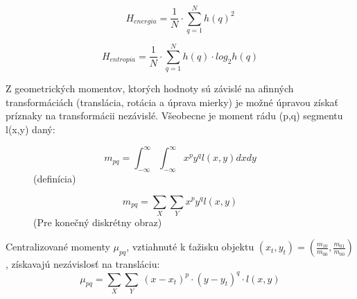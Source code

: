 \begin{figure}[!ht]
\begin{minipage}[b]{0.5\textwidth}
\begin{equation}
                \end{equation}
            \end{minipage}
            \begin{minipage}[b]{0.45\textwidth}
                \begin{equation}
                    H_{energia} = \frac{1}{N} \cdot \sum_{q=1}^{N} h(q)^2
                \end{equation}
            \end{minipage}
            \begin{minipage}[b]{0.45\textwidth}
                \begin{equation}
                    H_{entropia} = \frac{1}{N} \cdot \sum_{q=1}^{N} h(q) \cdot log_2h(q)
                \end{equation}
            \end{minipage}
        \end{figure}

        Z geometrických momentov, ktorých hodnoty sú závislé na afinných transformáciách (translácia, rotácia a úprava mierky) je možné úpravou získať príznaky na transformácii nezávislé. \cite{Erbo2017} Všeobecne je moment rádu (p,q) segmentu l(x,y) daný:
        \begin{figure}[!ht]
            \begin{minipage}[b]{0.45\textwidth}
                \begin{equation}
                    m_{pq} = \int_{-\infty}^\infty\int_{-\infty}^\infty x^p y^q l(x,y) dx dy
                \end{equation}
                \centering
                (definícia)
            \end{minipage}
            \begin{minipage}[b]{0.45\textwidth}
                \begin{equation}
                    m_{pq} = \sum_{X}\sum_{Y} x^p y^q l(x,y)
                \end{equation}
                \centering
                (Pre konečný diskrétny obraz)
            \end{minipage}
        \end{figure}

        Centralizované momenty $\mu_{pq}$, vztiahnuté k ťažisku objektu $(x_t,y_t) = (\frac{m_{10}}{m_{00}},\frac{m_{01}}{m_{00}})$, získavajú nezávislosť na transláciu:
        \begin{equation}\mu_{pq} = \sum_X\sum_Y\ (x-x_t)^p \cdot (y-y_t)^q \cdot l(x,y)\end{equation}

